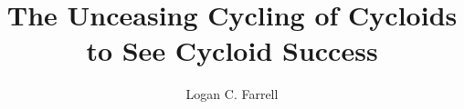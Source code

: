 \documentclass[draft, onecolumn, letterpaper, 12pt]{ruthesis}
\title{The Unceasing Cycling of Cycloids to See Cycloid Success}
\author{Logan C. Farrell}
\begin{document}
  \begin{frontmatter}
   \maketitle
   
   \tableofcontents
   \listoffigures
   \listoftables
  \end{frontmatter}


%
%






%
%
%
%
%
%
%
%

\appendix




\end{document}
